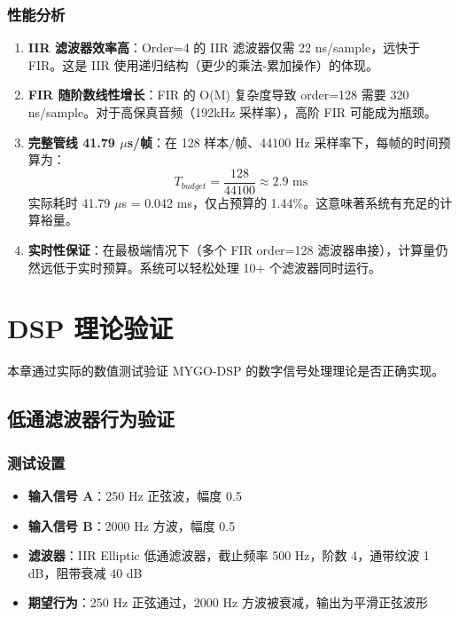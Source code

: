 ﻿\documentclass[12pt,a4paper,oneside]{ctexbook}
\begin{document}
\subsection{性能分析}

\begin{enumerate}
    \item \textbf{IIR 滤波器效率高}：Order=4 的 IIR 滤波器仅需 22 ns/sample，远快于 FIR。这是 IIR 使用递归结构（更少的乘法-累加操作）的体现。
    \item \textbf{FIR 随阶数线性增长}：FIR 的 O(M) 复杂度导致 order=128 需要 320 ns/sample。对于高保真音频（192kHz 采样率），高阶 FIR 可能成为瓶颈。
    \item \textbf{完整管线 41.79 $\mu$s/帧}：在 128 样本/帧、44100 Hz 采样率下，每帧的时间预算为：
    \[
    T_{budget} = \frac{128}{44100} \approx 2.9 \text{ ms}
    \]
    实际耗时 41.79 $\mu$s = 0.042 ms，仅占预算的 1.44\%。这意味著系统有充足的计算裕量。
    \item \textbf{实时性保证}：在最极端情况下（多个 FIR order=128 滤波器串接），计算量仍然远低于实时预算。系统可以轻松处理 10+ 个滤波器同时运行。
\end{enumerate}

\chapter{DSP 理论验证}

本章通过实际的数值测试验证 MYGO-DSP 的数字信号处理理论是否正确实现。

\section{低通滤波器行为验证}

\subsection{测试设置}

\begin{itemize}
    \item \textbf{输入信号 A}：250 Hz 正弦波，幅度 0.5
    \item \textbf{输入信号 B}：2000 Hz 方波，幅度 0.5
    \item \textbf{滤波器}：IIR Elliptic 低通滤波器，截止频率 500 Hz，阶数 4，通带纹波 1 dB，阻带衰减 40 dB
    \item \textbf{期望行为}：250 Hz 正弦通过，2000 Hz 方波被衰减，输出为平滑正弦波形
\end{itemize}
\end{document}
